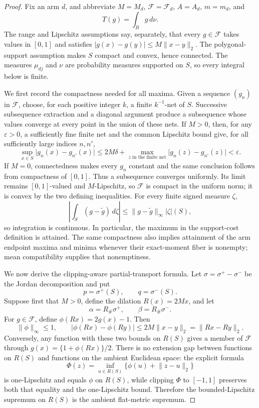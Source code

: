 \documentclass{article}
\begin{document}
\begin{proof}
Fix an arm \(d\), and abbreviate \(M=M_d\), \(\mathcal F=\mathcal F_d\), \(A=A_d\), \(m=m_d\), and
\[
 T(g)=\int_B g\,d\nu.
\]
The range and Lipschitz assumptions say, separately, that every \(g\in\mathcal F\) takes values in \([0,1]\) and satisfies \(\lvert g(x)-g(y)\rvert\leq M\lVert x-y\rVert_2\).  The polygonal-support assumption makes \(S\) compact and convex, hence connected.  The measures \(\mu_{dj}\) and \(\nu\) are probability measures supported on \(S\), so every integral below is finite.

We first record the compactness needed for all maxima.  Given a sequence \((g_n)\) in \(\mathcal F\), choose, for each positive integer \(k\), a finite \(k^{-1}\)-net of \(S\).  Successive subsequence extraction and a diagonal argument produce a subsequence whose values converge at every point in the union of these nets.  If \(M>0\), then, for any \(\varepsilon>0\), a sufficiently fine finite net and the common Lipschitz bound give, for all sufficiently large indices \(n,n'\),
\[
 \sup_{x\in S}\lvert g_n(x)-g_{n'}(x)\rvert
 \leq 2M\delta+\max_{z\text{ in the finite net}}
       \lvert g_n(z)-g_{n'}(z)\rvert
 <\varepsilon.
\]
If \(M=0\), connectedness makes every \(g_n\) constant and the same conclusion follows from compactness of \([0,1]\).  Thus a subsequence converges uniformly.  Its limit remains \([0,1]\)-valued and \(M\)-Lipschitz, so \(\mathcal F\) is compact in the uniform norm; it is convex by the two defining inequalities.  For every finite signed measure \(\zeta\),
\[
 \left\lvert\int_S(g-\widetilde g)\,d\zeta\right\rvert
 \leq \lVert g-\widetilde g\rVert_\infty\lvert\zeta\rvert(S),
\]
so integration is continuous.  In particular, the maximum in the support-cost definition is attained.  The same compactness also implies attainment of the arm endpoint maxima and minima whenever their exact-moment fiber is nonempty; mean compatibility supplies that nonemptiness.

We now derive the clipping-aware partial-transport formula.  Let \(\sigma=\sigma^+-\sigma^-\) be the Jordan decomposition and put
\[
 p=\sigma^+(S),\qquad q=\sigma^-(S).
\]
Suppose first that \(M>0\), define the dilation \(R(x)=2Mx\), and let
\[
 \alpha=R_\#\sigma^+,
 \qquad
 \beta=R_\#\sigma^-.
\]
For \(g\in\mathcal F\), define \(\phi(Rx)=2g(x)-1\).  Then
\[
 \lVert\phi\rVert_\infty\leq1,
 \qquad
 \lvert\phi(Rx)-\phi(Ry)\rvert
 \leq 2M\lVert x-y\rVert_2
 =\lVert Rx-Ry\rVert_2.
\]
Conversely, any function with these two bounds on \(R(S)\) gives a member of \(\mathcal F\) through \(g(x)=\{1+\phi(Rx)\}/2\).  There is no extension gap between functions on \(R(S)\) and functions on the ambient Euclidean space: the explicit formula
\[
 \Phi(z)=\inf_{u\in R(S)}\{\phi(u)+\lVert z-u\rVert_2\}
\]
is one-Lipschitz and equals \(\phi\) on \(R(S)\), while clipping \(\Phi\) to \([-1,1]\) preserves both that equality and the one-Lipschitz bound.  Therefore the bounded-Lipschitz supremum on \(R(S)\) is the ambient flat-metric supremum.


\end{proof}
\end{document}
